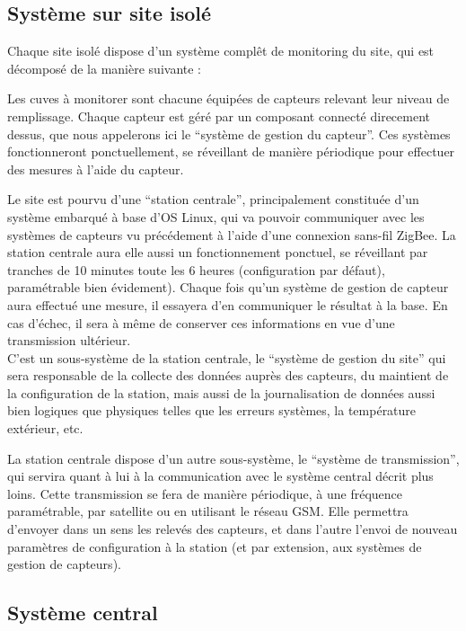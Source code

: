 
\subsection{Système sur site isolé}

Chaque site isolé dispose d'un système complêt de monitoring du site, qui est décomposé de la manière suivante :

Les cuves à monitorer sont chacune équipées de capteurs relevant leur niveau de remplissage. Chaque capteur est géré par un composant connecté direcement dessus, que nous appelerons ici le ``système de gestion du capteur''. Ces systèmes fonctionneront ponctuellement, se réveillant de manière périodique pour effectuer des mesures à l'aide du capteur.

Le site est pourvu d'une ``station centrale'', principalement constituée d'un système embarqué à base d'OS Linux, qui va pouvoir communiquer avec les systèmes de capteurs vu précédement à l'aide d'une connexion sans-fil ZigBee. La station centrale aura elle aussi un fonctionnement ponctuel, se réveillant par tranches de 10 minutes toute les 6 heures (configuration par défaut), paramétrable bien évidement). Chaque fois qu'un système de gestion de capteur aura effectué une mesure, il essayera d'en communiquer le résultat à la base. En cas d'échec, il sera à même de conserver ces informations en vue d'une transmission ultérieur.\\
C'est un sous-système de la station centrale, le ``système de gestion du site'' qui sera responsable de la collecte des données auprès des capteurs, du maintient de la configuration de la station, mais aussi de la journalisation de données aussi bien logiques que physiques telles que les erreurs systèmes, la température extérieur, etc.

La station centrale dispose d'un autre sous-système, le ``système de transmission'', qui servira quant à lui à la communication avec le système central décrit plus loins. Cette transmission se fera de manière périodique, à une fréquence paramétrable, par satellite ou en utilisant le réseau GSM. Elle permettra d'envoyer dans un sens les relevés des capteurs, et dans l'autre l'envoi de nouveau paramètres de configuration à la station (et par extension, aux systèmes de gestion de capteurs).

\subsection{Système central}

